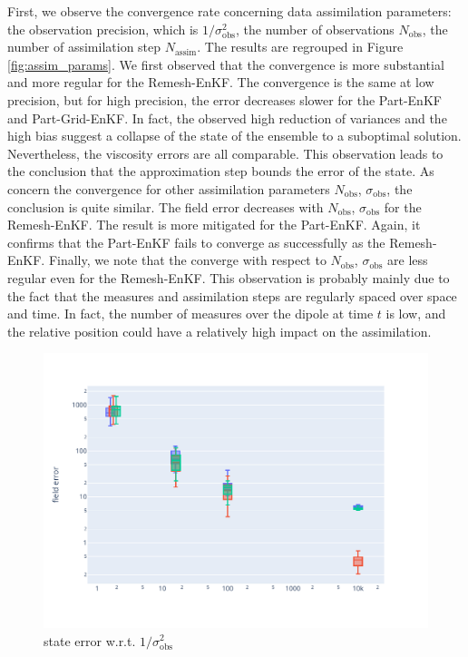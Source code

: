 First, we observe the convergence rate concerning data assimilation parameters: the observation precision, which is \(1/\sigma_{\text{obs}}^2\), the number of observations \(N_{\text{obs}}\), the number of assimilation step \(N_{\text{assim}}\).
The results are regrouped in Figure \ref{fig:assim_params}. We first observed that the convergence is more substantial and more regular for the Remesh-EnKF. The convergence is the same at low precision, but for high precision, the error decreases slower for the Part-EnKF and Part-Grid-EnKF. In fact, the observed high reduction of variances and the high bias suggest a collapse of the state of the ensemble to a suboptimal solution. Nevertheless, the viscosity errors are all comparable. This observation leads to the conclusion that the approximation step bounds the error of the state.
As concern the convergence for other assimilation parameters \(N_{\text{obs}}\), \(\sigma_{\text{obs}}\), the conclusion is quite similar. The field error decreases with \(N_{\text{obs}}\), \(\sigma_{\text{obs}}\) for the Remesh-EnKF. The result is more mitigated for the Part-EnKF. Again, it confirms that the Part-EnKF fails to converge as successfully as the Remesh-EnKF.
Finally, we note that the converge with respect to \(N_{\text{obs}}\), \(\sigma_{\text{obs}}\) are less regular even for the Remesh-EnKF. This observation is probably mainly due to the fact that the measures and assimilation steps are regularly spaced over space and time. In fact, the number of measures over the dipole at time $t$ is low, and the relative position could have a relatively high impact on the assimilation.

\begin{figure}[htbp]
	\captionsetup{labelformat=empty}
	\centering
	\includegraphics[width=\linewidth]{./images/app2d/MSE_obs_precision_box.pdf}
	\caption{state error w.r.t. $1/\sigma_{\text{obs}}^2$}
	\label{fig:obs_precision}
\end{figure}

